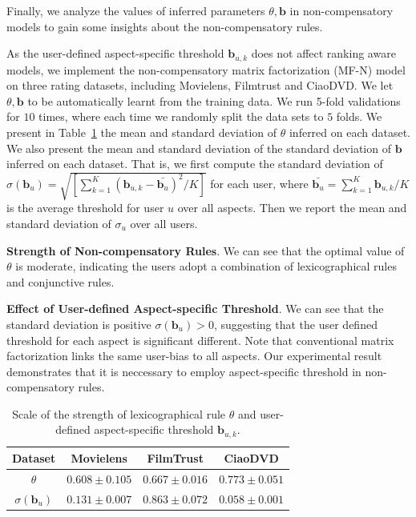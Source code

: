 \documentclass[letterpaper]{article} %
\begin{document}
Finally, we analyze the values of inferred parameters $\theta,\mathbf{b}$ in non-compensatory models to gain some insights about the non-compensatory rules. 

As the user-defined aspect-specific threshold $\mathbf{b}_{u,k}$ does not affect ranking aware models, we implement the non-compensatory matrix factorization (MF-N) model on three rating datasets, including Movielens, Filmtrust and CiaoDVD. We let $\theta,\mathbf{b}$ to be automatically learnt from the training data. We run 5-fold validations for $10$ times, where each time we randomly split the data sets to $5$ folds. We present in Table~\ref{tab:parameters} the mean and standard deviation of $\theta$ inferred on each dataset. We also present the mean and standard deviation of the standard deviation of $\mathbf{b}$ inferred on each dataset. That is, we first compute the standard deviation of $\sigma(\mathbf{b}_u)=\sqrt {[\sum_{k=1}^{K} (\mathbf{b}_{u,k}-\bar{\mathbf{b}_u})^2 /K]} $ for each user, where $\bar{\mathbf{b}_u}=\sum_{k=1}^K \mathbf{b}_{u,k} /K$ is the average threshold for user $u$ over all aspects. Then we report the mean and standard deviation of $\sigma_u$ over all users. 

\textbf{Strength of Non-compensatory Rules}. We can see that the optimal value of $\theta$ is moderate, indicating the users adopt a combination of lexicographical rules and conjunctive rules.  

\textbf{Effect of User-defined Aspect-specific Threshold}. We can see that the standard deviation is positive $\sigma(\mathbf{b}_{u})>0$, suggesting that the user defined threshold for each aspect is significant different. Note that conventional matrix factorization links the same user-bias to all aspects. Our experimental result demonstrates that it is neccessary to employ aspect-specific threshold in non-compensatory rules. 
\begin{table}[htp]
\caption{Scale of the strength of lexicographical rule $\theta$ and user-defined aspect-specific threshold $\mathbf{b}_{u,k}$.}
\scriptsize
\begin{center}
\begin{tabular}{|c|c|c|c|}
\hline
Dataset & Movielens & FilmTrust & CiaoDVD \\\hline
$\theta$ & $0.608\pm 0.105$ & $0.667\pm 0.016$ &	$0.773\pm 0.051$\\\hline
$\sigma(\mathbf{b}_{u})$ & $0.131\pm 0.007$ &	$0.863\pm 0.072$	& $0.058\pm 0.001$  \\\hline
\end{tabular}
\end{center}
\label{tab:parameters}
\end{table}%
\end{document}
